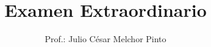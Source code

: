\documentclass[12pt,addpoints]{evalua}
\title{Examen Extraordinario}
\author{Prof.: Julio César Melchor Pinto}
\begin{document}
\begin{questions}
    \question[15] 
    \question[10] 
    \question[20] 
    \newpage
    \question[15] 
    \newpage
    \question[40] 
\end{questions}
\end{document}
